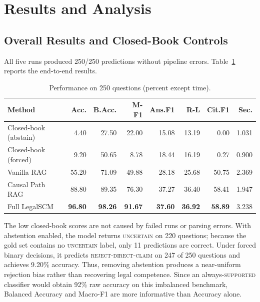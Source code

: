 \section{Results and Analysis}
\label{sec:results_analysis}

\subsection{Overall Results and Closed-Book Controls}

All five runs produced 250/250 predictions without pipeline errors.
Table~\ref{tab:main_results} reports the end-to-end results.

\begin{table}[t]
\centering
\caption{Performance on 250 questions (percent except time).}
\label{tab:main_results}
\scriptsize
\setlength{\tabcolsep}{1.35pt}
\begin{tabular}{@{}lrrrrrrr@{}}
\toprule
\textbf{Method}
& \textbf{Acc.}
& \textbf{B.Acc.}
& \textbf{M-F1}
& \textbf{Ans.F1}
& \textbf{R-L}
& \textbf{Cit.F1}
& \textbf{Sec.}\\
\midrule
Closed-book (abstain) & 4.40 & 27.50 & 22.00 & 15.08 & 13.19 & 0.00 & 1.031\\
Closed-book (forced) & 9.20 & 50.65 & 8.78 & 18.44 & 16.19 & 0.27 & 0.900\\
Vanilla RAG & 55.20 & 71.09 & 49.88 & 28.18 & 25.68 & 50.75 & 2.369\\
Causal Path RAG & 88.80 & 89.35 & 76.30 & 37.27 & 36.40 & 58.41 & 1.947\\
Full LegalSCM & \textbf{96.80} & \textbf{98.26} & \textbf{91.67}
& \textbf{37.60} & \textbf{36.92} & \textbf{58.89} & 3.238\\
\bottomrule
\end{tabular}
\end{table}

The low closed-book scores are not caused by failed runs or parsing errors.
With abstention enabled, the model returns \textsc{uncertain} on 220 questions;
because the gold set contains no \textsc{uncertain} label, only 11 predictions
are correct. Under forced binary decisions, it predicts
\textsc{reject-direct-claim} on 247 of 250 questions and achieves 9.20\%
accuracy. Thus, removing abstention produces a near-uniform rejection bias
rather than recovering legal competence. Since an always-\textsc{supported}
classifier would obtain 92\% raw accuracy on this imbalanced benchmark,
Balanced Accuracy and Macro-F1 are more informative than Accuracy alone.

